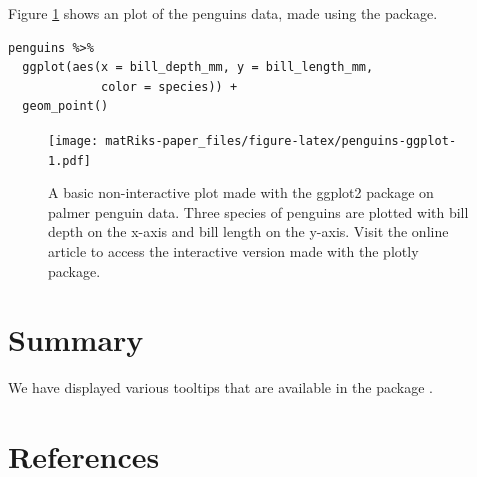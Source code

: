 Figure \ref{fig:penguins-ggplot} shows an plot of the penguins data, made using the  package.

\begin{verbatim}
penguins %>% 
  ggplot(aes(x = bill_depth_mm, y = bill_length_mm, 
             color = species)) + 
  geom_point()
\end{verbatim}

\begin{figure}
\centering
\texttt{[image: matRiks-paper\_files/figure-latex/penguins-ggplot-1.pdf]}
\caption{\label{fig:penguins-ggplot}A basic non-interactive plot made with the ggplot2 package on palmer penguin data. Three species of penguins are plotted with bill depth on the x-axis and bill length on the y-axis. Visit the online article to access the interactive version made with the plotly package.}
\end{figure}

\section{Summary}\label{summary-1}

We have displayed various tooltips that are available in the package .

\section*{References}\label{references}


